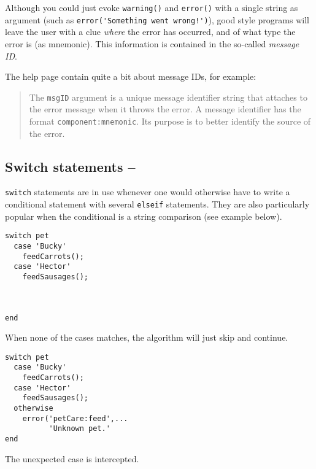 Although you could just evoke \lstinline!warning()! and \lstinline!error()! with a single string as argument (such as \lstinline~error('Something went wrong!')~), good style programs will leave the user with a clue \emph{where} the error has occurred, and of what type the error is (as mnemonic). This information is contained in the so-called \emph{message ID}.

The \matlab{} help page contain quite a bit about message IDs, for example:
\begin{quotation}
The \lstinline!msgID! argument is a unique message identifier string that \matlab{} attaches to the error message when it throws the error. A message identifier has the format \lstinline!component:mnemonic!. Its purpose is to better identify the source of the error.
\end{quotation}


\subsection{Switch statements -- \cleansymbol\cleansymbol}

\lstinline!switch! statements are in use whenever one would otherwise have to write a conditional statement with several \lstinline!elseif! statements. They are also particularly popular when the conditional is a string comparison (see example below).

\hfill
\begin{minipage}[t]{.45\textwidth}
\begin{lstlisting}[framerule=2pt,rulecolor=\color{badred}]
switch pet
  case 'Bucky'
    feedCarrots();
  case 'Hector'
    feedSausages();



end
\end{lstlisting}
When none of the cases matches, the algorithm will just skip and continue.
\end{minipage}
\hfill
\begin{minipage}[t]{.45\textwidth}
\begin{lstlisting}[framerule=2pt,rulecolor=\color{goodgreen}]
switch pet
  case 'Bucky'
    feedCarrots();
  case 'Hector'
    feedSausages();
  otherwise
    error('petCare:feed',...
          'Unknown pet.'
end
\end{lstlisting}
The unexpected case is intercepted.
\end{minipage}
\hfill



